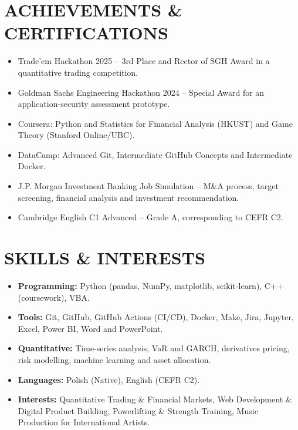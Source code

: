 \documentclass[10pt,a4paper]{article}
\begin{document}
\section{ACHIEVEMENTS \& CERTIFICATIONS}
\begin{itemize}
  \item Trade'em Hackathon 2025 -- 3rd Place and Rector of SGH Award in a quantitative trading competition.
  \item Goldman Sachs Engineering Hackathon 2024 -- Special Award for an application-security assessment prototype.
  \item Coursera: Python and Statistics for Financial Analysis (HKUST) and Game Theory (Stanford Online/UBC).
  \item DataCamp: Advanced Git, Intermediate GitHub Concepts and Intermediate Docker.
  \item J.P. Morgan Investment Banking Job Simulation -- M\&A process, target screening, financial analysis and investment recommendation.
  \item Cambridge English C1 Advanced -- Grade A, corresponding to CEFR C2.
\end{itemize}

\section{SKILLS \& INTERESTS}
\begin{itemize}
  \item \textbf{Programming:} Python (pandas, NumPy, matplotlib, scikit-learn), C++ (coursework), VBA.
  \item \textbf{Tools:} Git, GitHub, GitHub Actions (CI/CD), Docker, Make, Jira, Jupyter, Excel, Power BI, Word and PowerPoint.
  \item \textbf{Quantitative:} Time-series analysis, VaR and GARCH, derivatives pricing, risk modelling, machine learning and asset allocation.
  \item \textbf{Languages:} Polish (Native), English (CEFR C2).
  \item \textbf{Interests:} Quantitative Trading \& Financial Markets, Web Development \& Digital Product Building, Powerlifting \& Strength Training, Music Production for International Artists.
\end{itemize}
\end{document}
